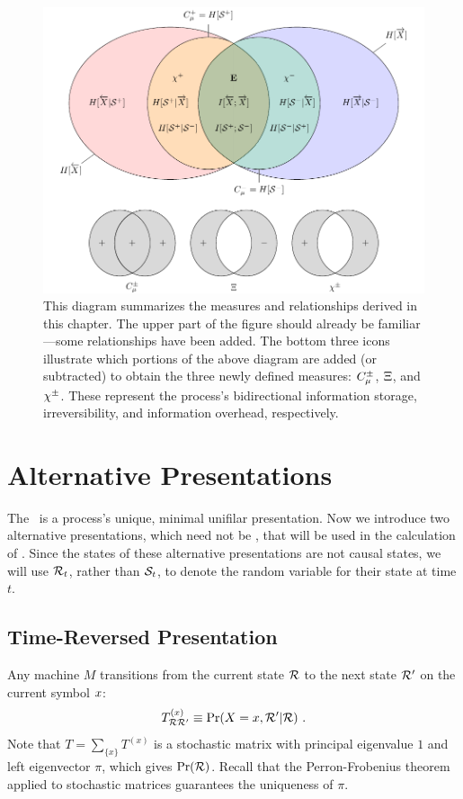 \begin{figure}[h!]
\centering
\includegraphics{../chapter2/figures/tikz/4var_eM_more3}
\caption{This diagram summarizes the measures and relationships derived in this chapter. The upper part of the figure should already be familiar---some relationships have been added. The bottom three icons illustrate which portions of the above diagram are added (or subtracted) to obtain the three newly defined measures: $C_\mu^{\pm}$, $\Xi$, and $\chi^{\pm}$. These represent the process's bidirectional information storage, irreversibility, and information overhead, respectively.}
\label{4var_eM_more3}
\end{figure}

\section{Alternative Presentations}

The \eM\ is a process's unique, minimal unifilar presentation. Now we introduce
two alternative presentations, which need not be \eMs, that will be used in
the calculation of \EE.  Since the states of these alternative presentations
are not causal states, we will use $\mathcal{R}_t$, rather than 
$\mathcal{S}_t$, to denote the random variable for their state at time $t$.

\subsection{Time-Reversed Presentation}

Any machine $M$ transitions from the current state $\mathcal{R}$ to the
next state ${\cal R}^{\prime}$ on the current symbol ${x}$:
\begin{equation}
T^{(x)}_{\mathcal{R}{\cal R}^{\prime}} 
  \equiv 
  \Pr({X}={x}, {\cal R}^{\prime} | \mathcal{R}) ~.
\end{equation}
Note that $T = \sum_{\{x\}} T^{(x)}$ is a stochastic matrix with principal
eigenvalue $1$ and left eigenvector $\pi$, which gives $\Pr(\mathcal{R})$.
Recall that the Perron-Frobenius theorem applied to stochastic matrices
guarantees the uniqueness of $\pi$.

